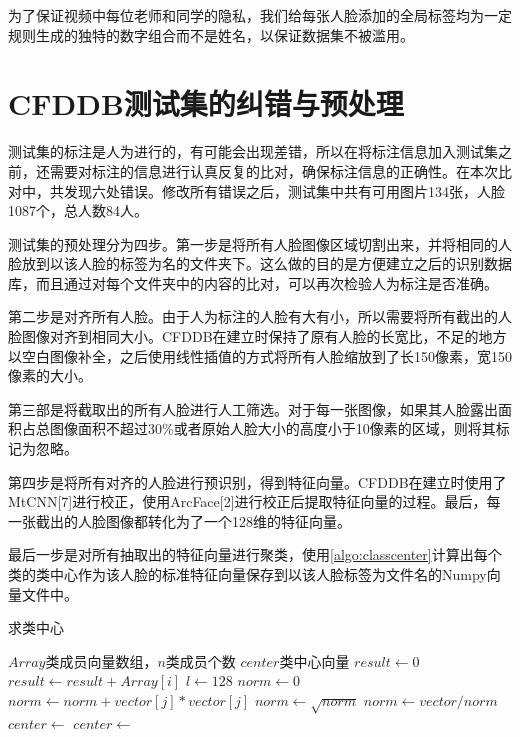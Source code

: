 为了保证视频中每位老师和同学的隐私，我们给每张人脸添加的全局标签均为一定规则生成的独特的数字组合而不是姓名，以保证数据集不被滥用。

\section{CFDDB测试集的纠错与预处理}

测试集的标注是人为进行的，有可能会出现差错，所以在将标注信息加入测试集之前，还需要对标注的信息进行认真反复的比对，确保标注信息的正确性。在本次比对中，共发现六处错误。修改所有错误之后，测试集中共有可用图片134张，人脸1087个，总人数84人。

测试集的预处理分为四步。第一步是将所有人脸图像区域切割出来，并将相同的人脸放到以该人脸的标签为名的文件夹下。这么做的目的是方便建立之后的识别数据库，而且通过对每个文件夹中的内容的比对，可以再次检验人为标注是否准确。

第二步是对齐所有人脸。由于人为标注的人脸有大有小，所以需要将所有截出的人脸图像对齐到相同大小。CFDDB在建立时保持了原有人脸的长宽比，不足的地方以空白图像补全，之后使用线性插值的方式将所有人脸缩放到了长150像素，宽150像素的大小。

第三部是将截取出的所有人脸进行人工筛选。对于每一张图像，如果其人脸露出面积占总图像面积不超过$30\%$或者原始人脸大小的高度小于10像素的区域，则将其标记为忽略。

第四步是将所有对齐的人脸进行预识别，得到特征向量。CFDDB在建立时使用了MtCNN[7]进行校正，使用ArcFace[2]进行校正后提取特征向量的过程。最后，每一张截出的人脸图像都转化为了一个128维的特征向量。

最后一步是对所有抽取出的特征向量进行聚类，使用\ref{algo:classcenter}计算出每个类的类中心作为该人脸的标准特征向量保存到以该人脸标签为文件名的Numpy向量文件中。

\begin{algorithm}
	\caption{求类中心}
	\label{algo:classcenter}
	\begin{algorithmic}[1] %
		\Require $Array$类成员向量数组，$n$类成员个数 %
		\Ensure $center$类中心向量 %
		\State $result \gets 0$
		\State $result \gets result + Array[i]$
		\EndFor
		\State {}
		\EndFunction
		\State %
		\State $l\gets 128$
		\State $norm\gets 0$
		\State $norm\gets norm + vector[j] * vector[j]$
		\EndFor
		\State $norm\gets \sqrt{norm}$
		\State $norm\gets vector / norm$
		\State {}
		\EndFunction
		\State
		\State $center\gets $
		\State $center\gets $
		\State {}
		\EndFunction
	\end{algorithmic}
\end{algorithm}

